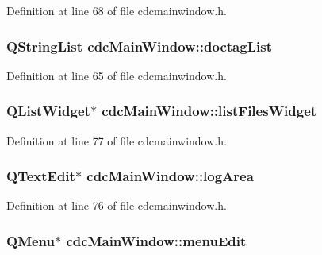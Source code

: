 Definition at line 68 of file cdcmainwindow.\+h.

\hypertarget{classcdc_main_window_aca67c5aa9dee926f1ea9190b23709d7d}{
\subsubsection[{doctag\+List}]{\setlength{\rightskip}{0pt plus 5cm}Q\+String\+List cdc\+Main\+Window\+::doctag\+List\hspace{0.3cm}{\ttfamily [private]}}}\label{classcdc_main_window_aca67c5aa9dee926f1ea9190b23709d7d}


Definition at line 65 of file cdcmainwindow.\+h.

\hypertarget{classcdc_main_window_a5e658d4cb5bc593d10e30b9fbf680c84}{
\subsubsection[{list\+Files\+Widget}]{\setlength{\rightskip}{0pt plus 5cm}Q\+List\+Widget$\ast$ cdc\+Main\+Window\+::list\+Files\+Widget\hspace{0.3cm}{\ttfamily [private]}}}\label{classcdc_main_window_a5e658d4cb5bc593d10e30b9fbf680c84}


Definition at line 77 of file cdcmainwindow.\+h.

\hypertarget{classcdc_main_window_acf5379568430403fc8080d3e2fdc22f4}{
\subsubsection[{log\+Area}]{\setlength{\rightskip}{0pt plus 5cm}Q\+Text\+Edit$\ast$ cdc\+Main\+Window\+::log\+Area\hspace{0.3cm}{\ttfamily [private]}}}\label{classcdc_main_window_acf5379568430403fc8080d3e2fdc22f4}


Definition at line 76 of file cdcmainwindow.\+h.

\hypertarget{classcdc_main_window_a0d41f03c46c693ee6a4d82b807aaca6b}{
\subsubsection[{menu\+Edit}]{\setlength{\rightskip}{0pt plus 5cm}Q\+Menu$\ast$ cdc\+Main\+Window\+::menu\+Edit\hspace{0.3cm}{\ttfamily [private]}}}\label{classcdc_main_window_a0d41f03c46c693ee6a4d82b807aaca6b}



